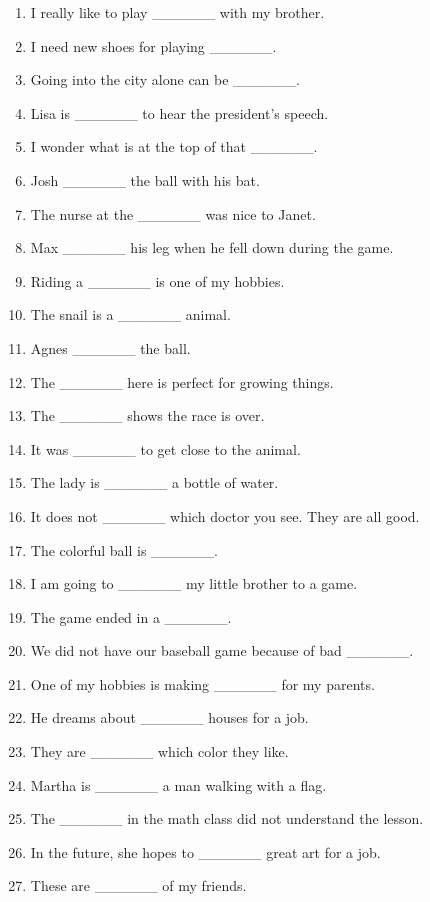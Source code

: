 \documentclass[a4paper,12pt]{article}
\begin{document}
\begin{enumerate}[label=\arabic*.]
    \item I really like to play \_\_\_\_\_\_ with my brother.
    \item I need new shoes for playing \_\_\_\_\_\_.
    \item Going into the city alone can be \_\_\_\_\_\_.
    \item Lisa is \_\_\_\_\_\_ to hear the president's speech.
    \item I wonder what is at the top of that \_\_\_\_\_\_.
    \item Josh \_\_\_\_\_\_ the ball with his bat.
    \item The nurse at the \_\_\_\_\_\_ was nice to Janet.
    \item Max \_\_\_\_\_\_ his leg when he fell down during the game.
    \item Riding a \_\_\_\_\_\_ is one of my hobbies.
    \item The snail is a \_\_\_\_\_\_ animal.
    \item Agnes \_\_\_\_\_\_ the ball.
    \item The \_\_\_\_\_\_ here is perfect for growing things.
    \item The \_\_\_\_\_\_ shows the race is over.
    \item It was \_\_\_\_\_\_ to get close to the animal.
    \item The lady is \_\_\_\_\_\_ a bottle of water.
    \item It does not \_\_\_\_\_\_ which doctor you see. They are all good.
    \item The colorful ball is \_\_\_\_\_\_.
    \item I am going to \_\_\_\_\_\_ my little brother to a game.
    \item The game ended in a \_\_\_\_\_\_.
    \item We did not have our baseball game because of bad \_\_\_\_\_\_.
    \item One of my hobbies is making \_\_\_\_\_\_ for my parents.
    \item He dreams about \_\_\_\_\_\_ houses for a job.
    \item They are \_\_\_\_\_\_ which color they like.
    \item Martha is \_\_\_\_\_\_ a man walking with a flag.
    \item The \_\_\_\_\_\_ in the math class did not understand the lesson.
    \item In the future, she hopes to \_\_\_\_\_\_ great art for a job.
    \item These are \_\_\_\_\_\_ of my friends.

\end{enumerate}
\end{document}
